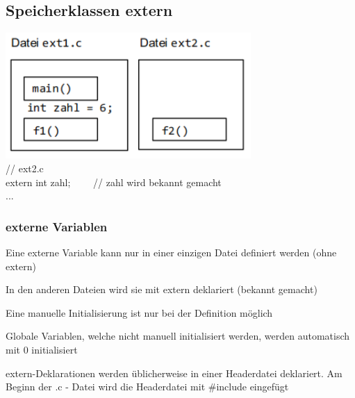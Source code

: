 			\subsection{Speicherklassen extern}
				\begin{minipage}[c]{9 cm}
					\includegraphics[width=0.7\textwidth]{pics/Speicherklasse_extern.png}\\
					// ext2.c\\
					extern int zahl; \ \ \ \ // zahl wird bekannt gemacht\\
					...
				\end{minipage}
				\hspace*{0.5cm}	
				\begin{minipage}[c]{9 cm}
					\vspace*{-0.4cm}
					\subsubsection{externe Variablen}
						\begin{compactitem}
							\item Eine externe Variable kann nur in einer einzigen Datei definiert werden (ohne
							extern)
							\item In den anderen Dateien wird sie mit extern deklariert (bekannt gemacht)
							\item Eine manuelle Initialisierung ist nur bei der Definition möglich
							\item Globale Variablen, welche nicht manuell initialisiert werden, werden
							automatisch mit 0 initialisiert
							\item extern-Deklarationen werden üblicherweise in einer Headerdatei deklariert. Am Beginn der .c - Datei wird die Headerdatei mit \#include eingefügt
						\end{compactitem}
				\end{minipage}	
